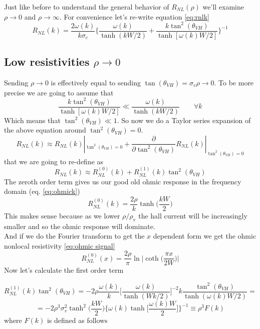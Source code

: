 Just like before to understand the general behavior of $R_{NL}(\rho)$ we'll examine $\rho\to 0$ and $\rho \to \infty$. For convenience let's re-write equation \ref{eq:rnlk}
\[
    R_{NL}(k)=\frac{2\omega(k)}{k\sigma_c}
    \bigg\{
        \frac{\omega(k)}{\tanh(kW/2)} + \frac{k\tan^2(\theta_{VH})}{\tanh[\omega(k)W/2]}    
    \bigg\}^{-1}
\]
















\subsection{Low resistivities $\rho\to 0$}
\label{sec:lowrho}
Sending $\rho\to 0$ is effectively equal to sending $\tan(\theta_{VH})=\sigma_v\rho\to 0$. To be more precise we are going to assume that
\[
    \frac{k\tan^2(\theta_{VH})}{\tanh[\omega(k)W/2]}\ll \frac{\omega(k)}{\tanh(kW/2)}\quad\quad \forall k  
\]
Which means that $\tan^2(\theta_{VH})\ll 1$. So now we do a Taylor series expansion of the above equation around $\tan^2(\theta_{VH})= 0$.
\[
    R_{NL}(k)\approx R_{NL}(k)|_{\tan^2(\theta_{VH})=0} +
    \frac \partial {\partial \tan^2(\theta_{VH})} R_{NL}(k)|_{\tan^2(\theta_{VH})=0}
\]
that we are going to re-define as
\[
    R_{NL}(k)\approx R_{NL}^{(0)}(k) + R_{NL}^{(1)}(k)\tan^2(\theta_{VH})
\]
The zeroth order term gives us our good old ohmic response in the frequency domain (eq. \ref{eq:ohmick})
\[
    R_{NL}^{(0)}(k)=\frac{2\rho}k\tanh\bigg(\frac{kW}2\bigg)
\]
This makes sense because as we lower $\rho/\rho_\textrm{v}$ the hall current will be increasingly smaller and so the ohmic response will dominate.\\
And if we do the Fourier transform to get the $x$ dependent form we get the ohmic nonlocal resistivity \ref{eq:ohmic signal}
\begin{equation}
    R_{NL}^{(0)}(x)=\frac{2\rho}\pi\ln\bigg |\coth \Big(\frac{\pi x}{2W}\Big)\bigg |
\end{equation}
Now let's calculate the first order term

\[
    R_{NL}^{(1)}(k)\tan^2(\theta_{VH})=-2\rho\frac{\omega(k)}k\bigg[\frac{\omega(k)}{\tanh(Wk/2)} \bigg]^{-2}k\frac{\tan^2(\theta_{VH})}{\tanh(\omega(k)W/2)}=
\]
\[
    =-2\rho^3\sigma_v^2 \tanh^2\bigg(\frac{kW}2\bigg)\bigg\{\omega(k)\tanh\bigg[\frac{\omega(k) W}2\bigg]\bigg\}^{-1}\equiv
    \rho^3F(k)
\]
where $F(k)$ is defined as follows

